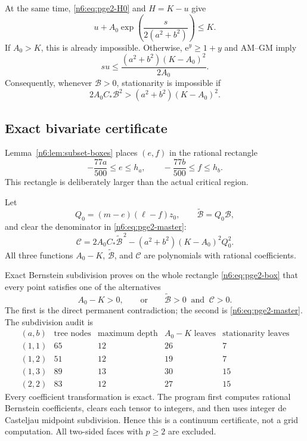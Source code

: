 \documentclass[11pt]{article}
\numberwithin{equation}{section}
\theoremstyle{definition}
\newcommand{\e}{\mathrm e}
\begin{document}
At the same time, \eqref{n6:eq:pge2-H0} and $H=K-u$ give
\[
 u+A_0\exp\left(\frac{s}{2(a^2+b^2)}\right)\le K.
\]
If $A_0>K$, this is already impossible.  Otherwise,
$\e^y\ge1+y$ and AM--GM imply
\begin{equation}
 su\le
 \frac{(a^2+b^2)(K-A_0)^2}{2A_0}.\label{n6:eq:pge2-su-upper}
\end{equation}
Consequently, whenever $\mathcal B>0$, stationarity is impossible if
\begin{equation}
 2A_0C_*\mathcal B^2
 >(a^2+b^2)(K-A_0)^2.\label{n6:eq:pge2-master}
\end{equation}

\subsection{Exact bivariate certificate}

Lemma~\ref{n6:lem:subset-boxes} places $(e,f)$ in the rational rectangle
\begin{equation}
 -\frac{77a}{500}\le e\le h_a,
 \qquad
 -\frac{77b}{500}\le f\le h_b.\label{n6:eq:pge2-box}
\end{equation}
This rectangle is deliberately larger than the actual critical region.

Let
\[
 Q_0=(m-e)(\ell-f)z_0,
 \qquad
 \widetilde{\mathcal B}=Q_0\mathcal B,
\]
and clear the denominator in \eqref{n6:eq:pge2-master}:
\begin{equation}
 \mathcal C
 =2A_0C_*\widetilde{\mathcal B}^{\,2}
 -(a^2+b^2)(K-A_0)^2Q_0^2.\label{n6:eq:pge2-C}
\end{equation}
All three functions $A_0-K$, $\widetilde{\mathcal B}$, and $\mathcal C$ are
polynomials with rational coefficients.

Exact Bernstein subdivision proves on the whole rectangle
\eqref{n6:eq:pge2-box} that every point satisfies one of the alternatives
\[
 A_0-K>0,
 \qquad\text{or}\qquad
 \widetilde{\mathcal B}>0\ \text{ and }\ \mathcal C>0.
\]
The first is the direct permanent contradiction; the second is
\eqref{n6:eq:pge2-master}.  The subdivision audit is
\begin{equation}
\begin{array}{c|c|c|c|c}
(a,b)&\text{tree nodes}&\text{maximum depth}&
 A_0-K\text{ leaves}&\text{stationarity leaves}\\ \hline
(1,1)&65&12&26&7\\
(1,2)&51&12&19&7\\
(1,3)&89&13&30&15\\
(2,2)&83&12&27&15
\end{array}\label{n6:eq:pge2-audit}
\end{equation}
Every coefficient transformation is exact.  The program first computes
rational Bernstein coefficients, clears each tensor to integers, and then
uses integer de Casteljau midpoint subdivision.  Hence this is a continuum
certificate, not a grid computation.  All two-sided faces with $p\ge2$ are
excluded.
\end{document}
